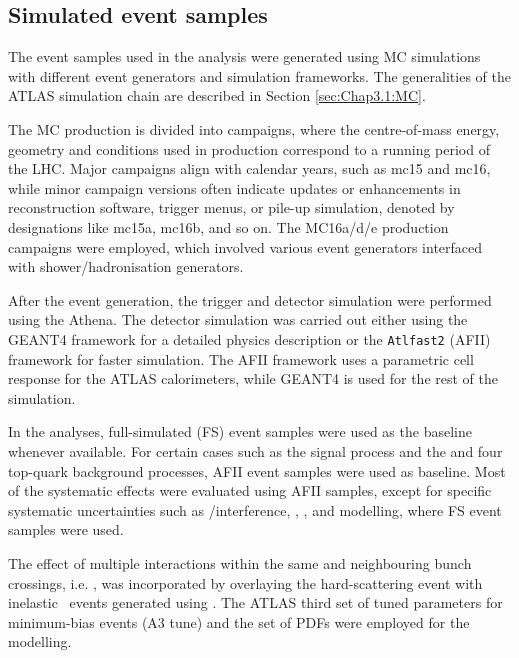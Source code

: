 \subsection{Simulated event samples}
\label{sec:ChaptH:Data_and_MC:MC}
The event samples used in the analysis were generated using MC 
simulations with different event generators and simulation frameworks. 
The generalities of the ATLAS simulation chain are described in 
Section \ref{sec:Chap3.1:MC}.

The MC production is divided into campaigns, where the centre-of-mass energy,
geometry and conditions used in production correspond to a running period of
the LHC.  Major campaigns align with calendar years, such as mc15 and mc16, 
while minor campaign versions often indicate updates or enhancements in 
reconstruction software, trigger menus, or pile-up simulation, denoted by 
designations like mc15a, mc16b, and so on.
The MC16a/d/e production campaigns were employed, which involved various event generators interfaced with shower/hadronisation generators. 


After the event generation, the trigger and detector simulation were 
performed using the Athena.
The detector simulation was carried out either using the GEANT4 framework \cite{GEANT4:2002zbu} 
for a detailed physics description or the \texttt{Atlfast2} \cite{SOFT-2010-01}
(AFII) framework for 
faster simulation. The AFII framework uses a parametric cell response for the ATLAS
calorimeters, while GEANT4 is used for the rest of the simulation. 

In the analyses, full-simulated (FS) event samples were used as the baseline whenever 
available. For certain cases such as the \tHq signal process and the \tHW
and four top-quark background processes, AFII event samples were used as baseline.
Most of the systematic effects were evaluated using AFII samples, except for 
specific systematic uncertainties such as \ttbar/\tW interference, \ttZ, \ttW, and \tWZ 
modelling, where FS event samples were used.

The effect of multiple interactions within the same and neighbouring 
bunch crossings, i.e. \pileup, was incorporated by overlaying the hard-scattering event 
with inelastic \pp\ events generated using \PYTHIA[8.186]\cite{Sjostrand:2007gs}. 
The ATLAS third set of tuned parameters for minimum-bias events (A3 tune\cite{ATL-PHYS-PUB-2016-017}) 
and the \NNPDF[2.3lo] set of PDFs\cite{Ball:2012cx} were employed for the \pileup modelling.

